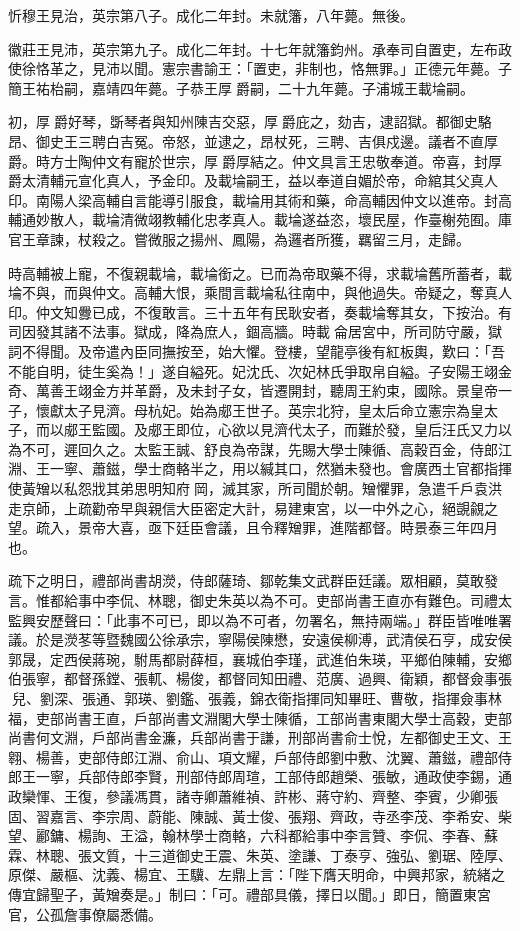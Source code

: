 忻穆王見治，英宗第八子。成化二年封。未就籓，八年薨。無後。

徽莊王見沛，英宗第九子。成化二年封。十七年就籓鈞州。承奉司自置吏，左布政使徐恪革之，見沛以聞。憲宗書諭王：「置吏，非制也，恪無罪。」正德元年薨。子簡王祐枱嗣，嘉靖四年薨。子恭王厚爵嗣，二十九年薨。子浦城王載埨嗣。

初，厚爵好琴，斲琴者與知州陳吉交惡，厚爵庇之，劾吉，逮詔獄。都御史駱昂、御史王三聘白吉冤。帝怒，並逮之，昂杖死，三聘、吉俱戍邊。議者不直厚爵。時方士陶仲文有寵於世宗，厚爵厚結之。仲文具言王忠敬奉道。帝喜，封厚爵太清輔元宣化真人，予金印。及載埨嗣王，益以奉道自媚於帝，命綰其父真人印。南陽人梁高輔自言能導引服食，載埨用其術和藥，命高輔因仲文以進帝。封高輔通妙散人，載埨清微翊教輔化忠孝真人。載埨遂益恣，壞民屋，作臺榭苑囿。庫官王章諫，杖殺之。嘗微服之揚州、鳳陽，為邏者所獲，羈留三月，走歸。

時高輔被上寵，不復親載埨，載埨銜之。已而為帝取藥不得，求載埨舊所蓄者，載埨不與，而與仲文。高輔大恨，乘間言載埨私往南中，與他過失。帝疑之，奪真人印。仲文知釁已成，不復敢言。三十五年有民耿安者，奏載埨奪其女，下按治。有司因發其諸不法事。獄成，降為庶人，錮高牆。時載侖居宮中，所司防守嚴，獄詞不得聞。及帝遣內臣同撫按至，始大懼。登樓，望龍亭後有紅板輿，歎曰：「吾不能自明，徒生奚為！」遂自縊死。妃沈氏、次妃林氏爭取帛自縊。子安陽王翊金奇、萬善王翊金方并革爵，及未封子女，皆遷開封，聽周王約束，國除。景皇帝一子，懷獻太子見濟。母杭妃。始為郕王世子。英宗北狩，皇太后命立憲宗為皇太子，而以郕王監國。及郕王即位，心欲以見濟代太子，而難於發，皇后汪氏又力以為不可，遲回久之。太監王誠、舒良為帝謀，先賜大學士陳循、高穀百金，侍郎江淵、王一寧、蕭鎡，學士商輅半之，用以緘其口，然猶未發也。會廣西土官都指揮使黃矰以私怨戕其弟思明知府岡，滅其家，所司聞於朝。矰懼罪，急遣千戶袁洪走京師，上疏勸帝早與親信大臣密定大計，易建東宮，以一中外之心，絕覬覦之望。疏入，景帝大喜，亟下廷臣會議，且令釋矰罪，進階都督。時景泰三年四月也。

疏下之明日，禮部尚書胡濙，侍郎薩琦、鄒乾集文武群臣廷議。眾相顧，莫敢發言。惟都給事中李侃、林聰，御史朱英以為不可。吏部尚書王直亦有難色。司禮太監興安歷聲曰：「此事不可已，即以為不可者，勿署名，無持兩端。」群臣皆唯唯署議。於是濙苳等暨魏國公徐承宗，寧陽侯陳懋，安遠侯柳溥，武清侯石亨，成安侯郭晟，定西侯蔣琬，駙馬都尉薛桓，襄城伯李瑾，武進伯朱瑛，平鄉伯陳輔，安鄉伯張寧，都督孫鏜、張軏、楊俊，都督同知田禮、范廣、過興、衛穎，都督僉事張兒、劉深、張通、郭瑛、劉鑑、張義，錦衣衛指揮同知畢旺、曹敬，指揮僉事林福，吏部尚書王直，戶部尚書文淵閣大學士陳循，工部尚書東閣大學士高穀，吏部尚書何文淵，戶部尚書金濂，兵部尚書于謙，刑部尚書俞士悅，左都御史王文、王翱、楊善，吏部侍郎江淵、俞山、項文耀，戶部侍郎劉中敷、沈翼、蕭鎡，禮部侍郎王一寧，兵部侍郎李賢，刑部侍郎周瑄，工部侍郎趙榮、張敏，通政使李錫，通政欒惲、王復，參議馮貫，諸寺卿蕭維禎、許彬、蔣守約、齊整、李賓，少卿張固、習嘉言、李宗周、蔚能、陳誠、黃士俊、張翔、齊政，寺丞李茂、李希安、柴望、酈鏞、楊詢、王溢，翰林學士商輅，六科都給事中李言贊、李侃、李春、蘇霖、林聰、張文質，十三道御史王震、朱英、塗謙、丁泰亨、強弘、劉琚、陸厚、原傑、嚴樞、沈義、楊宜、王驥、左鼎上言：「陛下膺天明命，中興邦家，統緒之傳宜歸聖子，黃矰奏是。」制曰：「可。禮部具儀，擇日以聞。」即日，簡置東宮官，公孤詹事僚屬悉備。

